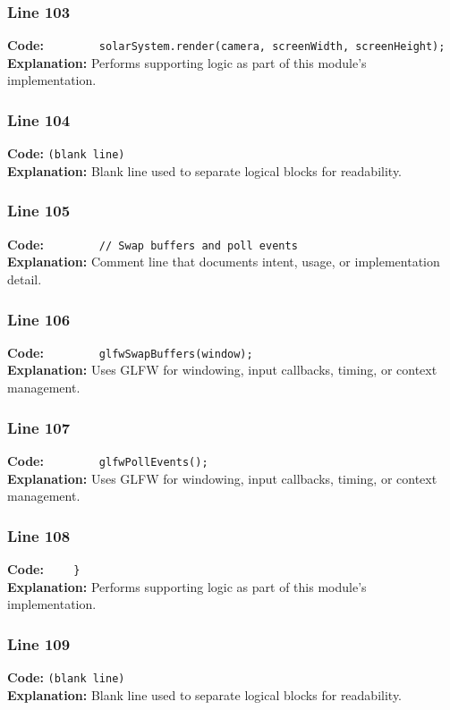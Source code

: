 \documentclass[11pt,a4paper]{article}
\begin{document}
\subsubsection*{Line 103}
\textbf{Code:} \verb|        solarSystem.render(camera, screenWidth, screenHeight);|\\
\textbf{Explanation:} Performs supporting logic as part of this module's implementation.

\subsubsection*{Line 104}
\textbf{Code:} \texttt{(blank line)}\\
\textbf{Explanation:} Blank line used to separate logical blocks for readability.

\subsubsection*{Line 105}
\textbf{Code:} \verb|        // Swap buffers and poll events|\\
\textbf{Explanation:} Comment line that documents intent, usage, or implementation detail.

\subsubsection*{Line 106}
\textbf{Code:} \verb|        glfwSwapBuffers(window);|\\
\textbf{Explanation:} Uses GLFW for windowing, input callbacks, timing, or context management.

\subsubsection*{Line 107}
\textbf{Code:} \verb|        glfwPollEvents();|\\
\textbf{Explanation:} Uses GLFW for windowing, input callbacks, timing, or context management.

\subsubsection*{Line 108}
\textbf{Code:} \verb|    }|\\
\textbf{Explanation:} Performs supporting logic as part of this module's implementation.

\subsubsection*{Line 109}
\textbf{Code:} \texttt{(blank line)}\\
\textbf{Explanation:} Blank line used to separate logical blocks for readability.
\end{document}
